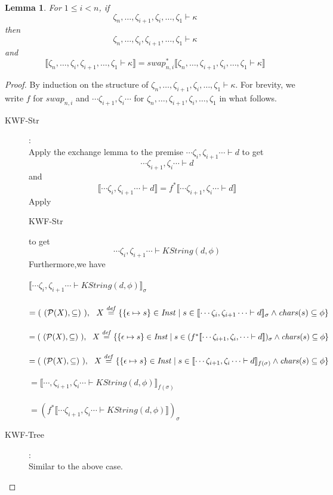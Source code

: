 \documentclass{article}
\newtheorem{lemma}{Lemma}
\newcommand{\sem}[1]{\llbracket #1 \rrbracket}
\newcommand{\defeq}{\overset{\mathit{def}}{=}}
\begin{document}
\begin{lemma}
For $1 \leq i < n$, if $$\zeta_n,\ldots,\zeta_{i+1},\zeta_i,\ldots,\zeta_1 \vdash \kappa$$ then $$\zeta_n,\ldots,\zeta_{i},\zeta_{i+1},\ldots,\zeta_1 \vdash \kappa$$ and $$\sem{\zeta_n,\ldots,\zeta_{i},\zeta_{i+1},\ldots,\zeta_1 \vdash \kappa} = \mathit{swap}_{n,i}^* \sem{\zeta_n,\ldots,\zeta_{i+1},\zeta_i,\ldots,\zeta_1 \vdash \kappa}$$
\label{lemma:kwf-exchng}
\end{lemma}
 
\begin{proof}
By induction on the structure of $\zeta_n,\ldots,\zeta_{i+1},\zeta_i,\ldots,\zeta_1 \vdash \kappa$.
For brevity, we write $f$ for $swap_{n,i}$ and $\cdots \zeta_{i+1},\zeta_i \cdots$ for $\zeta_n,\ldots,\zeta_{i+1},\zeta_{i},\ldots,\zeta_1$ in what follows.
\begin{description}
\item[KWF-Str]:~\\
Apply the exchange lemma to the premise $\cdots \zeta_{i},\zeta_{i+1} \cdots \vdash d$ to get $$\cdots \zeta_{i+1},\zeta_{i} \cdots \vdash d$$ and $$\sem{\cdots\zeta_i,\zeta_{i+1}\cdots \vdash d} = f^* \sem{\cdots\zeta_{i+1},\zeta_i\cdots \vdash d}$$ Apply \begin{sc}KWF-Str\end{sc} to get $$\cdots\zeta_{i},\zeta_{i+1}\cdots \vdash \mathit{KString}(d,\phi)$$
Furthermore,we have\\~\\
$\sem{\cdots \zeta_{i},\zeta_{i+1} \cdots \vdash \mathit{KString}(d,\phi)}_\sigma$\\~\\
$= (~(\mathcal P (X), \subseteq)~),~~\small{X \defeq \{ \{ \epsilon \mapsto s\} \in \mathit{Inst} \mid s \in \sem{\cdots \zeta_{i},\zeta_{i+1} \cdots \vdash d}_\sigma \wedge \mathit{chars}(s) \subseteq \phi \}}$\\~\\
$= (~(\mathcal P (X), \subseteq)~),~~\small{X \defeq \{ \{ \epsilon \mapsto s\} \in \mathit{Inst} \mid s \in (f^*\sem{\cdots\zeta_{i+1},\zeta_i,\cdots \vdash d})_\sigma \wedge \mathit{chars}(s) \subseteq \phi \}}$\\~\\
$= (~(\mathcal P (X), \subseteq)~),~~\small{X \defeq \{ \{ \epsilon \mapsto s\} \in \mathit{Inst} \mid s \in \sem{\cdots \zeta_{i+1},\zeta_i \cdots \vdash d}_{f(\sigma)} \wedge \mathit{chars}(s) \subseteq \phi \}}$\\~\\
$= \sem{\cdots,\zeta_{i+1},\zeta_i \cdots \vdash \mathit{KString}(d,\phi)}_{f(\sigma)}$\\~\\
$= (f^* \sem{\cdots \zeta_{i+1},\zeta_i \cdots \vdash \mathit{KString}(d,\phi)})_\sigma $
\item[KWF-Tree]:~\\
Similar to the above case.


\end{description}
\end{proof}
\end{document}
